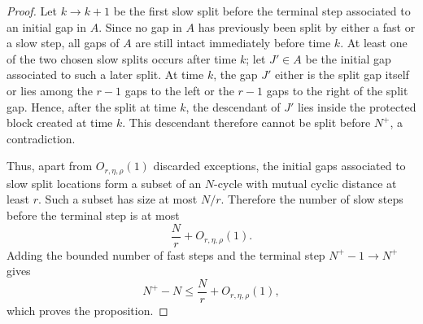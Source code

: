 \documentclass[10pt,a4paper]{amsart}
\begin{document}
\begin{proof}
\bigskip
\noindent
Let $k\to k+1$ be the first slow split before the terminal step associated to an initial gap in $A$. Since no gap in $A$ has previously been split by either a fast or a slow step, all gaps of $A$ are still intact immediately before time $k$. At least one of the two chosen slow splits occurs after time $k$; let $J'\in A$ be the initial gap associated to such a later split. At time $k$, the gap $J'$ either is the split gap itself or lies among the $r-1$ gaps to the left or the $r-1$ gaps to the right of the split gap. Hence, after the split at time $k$, the descendant of $J'$ lies inside the protected block created at time $k$. This descendant therefore cannot be split before $N^+$, a contradiction.

\bigskip
\noindent
Thus, apart from $O_{r,\eta,\rho}(1)$ discarded exceptions, the initial gaps associated to slow split locations form a subset of an $N$-cycle with mutual cyclic distance at least $r$. Such a subset has size at most $N/r$. Therefore the number of slow steps before the terminal step is at most
\[
    \frac Nr+O_{r,\eta,\rho}(1).
\]
Adding the bounded number of fast steps and the terminal step $N^+-1\to N^+$ gives
\[
    N^+-N
    \leq
    \frac Nr+O_{r,\eta,\rho}(1),
\]
which proves the proposition.
\end{proof}
\end{document}
